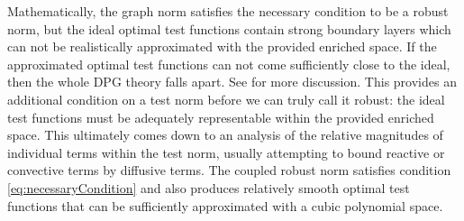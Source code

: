 \documentclass{article}
\begin{document}
Mathematically, the graph norm satisfies the necessary condition to be a robust norm, but the ideal optimal test functions contain strong boundary
layers which can not be realistically approximated with the provided enriched space.
If the approximated optimal test functions can not come sufficiently close to the ideal, then the whole DPG theory falls apart.
See \cite{PracticalDPG} for more discussion.
This provides an additional condition on a test norm before we can truly call it robust: the ideal test functions must be adequately representable within 
the provided enriched space.
This ultimately comes down to an analysis of the relative magnitudes of individual terms within the test norm, usually attempting to bound reactive or convective terms by diffusive terms.
The coupled robust norm satisfies condition \eqref{eq:necessaryCondition} and also produces relatively smooth optimal test functions that can be sufficiently approximated
with a cubic polynomial space.
\end{document}
